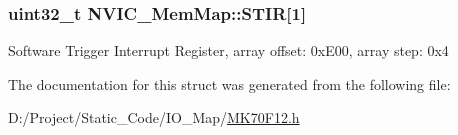 \subsubsection[{S\+T\+I\+R}]{\setlength{\rightskip}{0pt plus 5cm}uint32\+\_\+t N\+V\+I\+C\+\_\+\+Mem\+Map\+::\+S\+T\+I\+R\mbox{[}1\mbox{]}}\label{struct_n_v_i_c___mem_map_a417658a729224de65052153f5c2cc419}
Software Trigger Interrupt Register, array offset\+: 0x\+E00, array step\+: 0x4 

The documentation for this struct was generated from the following file\+:\begin{DoxyCompactItemize}
\item 
D\+:/\+Project/\+Static\+\_\+\+Code/\+I\+O\+\_\+\+Map/\hyperlink{_m_k70_f12_8h}{M\+K70\+F12.\+h}\end{DoxyCompactItemize}
